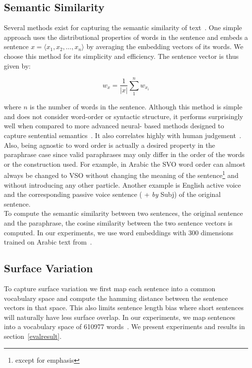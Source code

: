 \documentclass[11pt,letterpaper]{article}
\begin{document}
\subsection{Semantic Similarity}	
Several methods exist for capturing the semantic similarity of text~\cite{sim1,sim2,sim3}. One simple approach uses the distributional properties of words in the sentence and embeds a sentence 
$x = \langle x_1, x_2, \ldots, x_n  \rangle$ by averaging the embedding vectors of its words. We choose this method for its simplicity and efficiency. The sentence vector is thus given by:

\begin{equation}
w_x = \frac{1}{|x|} \sum_{1}^{n} w_{x_i}
\end{equation}

where $n$ is the number of words in the sentence. 
 Although this method is simple and does not consider word-order or syntactic structure, it performs surprisingly well when compared to more advanced neural- based methods designed to capture sentential semantics~\cite{sim4}. It also correlates highly with human judgement~\cite{sim4}. Also, being agnostic to word order is actually a desired property in the paraphrase case since valid paraphrases may only differ in the order of the words or the construction used. For example, in Arabic the SVO word order can almost always be changed to VSO without changing the meaning of the sentence\footnote{except for emphasis} and without introducing any other particle. Another example is English active voice and the corresponding passive voice sentence ( + \emph{by} Subj) of the original sentence. \\
 To compute the semantic similarity between two sentences, the original sentence and the paraphrase, the cosine similarity between the two sentence vectors is computed. In our experiments, we use word embeddings with 300 dimensions trained on Arabic text from~\cite{bojanowski2016enriching}.
 
\subsection{Surface Variation}
To capture surface variation we first map each sentence into a common vocabulary space and compute the hamming distance between the sentence vectors in that space. This also limits sentence length bias where short sentences will naturally have less surface overlap. In our experiments, we map sentences into a vocabulary space of 610977 words~\cite{bojanowski2016enriching}. We present experiments and results in section~\ref{evalresult}.
\end{document}
